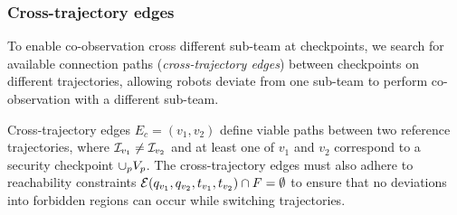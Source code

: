 \documentclass[10pt,twocolumn,twoside]{IEEEtran}
\newcommand{\news}{\color{blue}}
\begin{document}


\subsubsection{Cross-trajectory edges}\label{sec:cross-traj-edges}
To enable co-observation cross different sub-team at checkpoints, we search for available connection paths (\emph{cross-trajectory edges}) between checkpoints on different trajectories, allowing robots deviate from one sub-team to perform co-observation with a different sub-team. 

Cross-trajectory edges $E_c = (v_1, v_2)$ define viable paths between two reference trajectories, where $\mathcal{I}_{v_1}\neq\mathcal{I}_{v_2}$ and at least one of $v_1 $ and $v_2$ correspond to a security checkpoint $\cup_p V_p$. The cross-trajectory edges must also adhere to reachability constraints $\mathcal{E}(q_{v_1}, q_{v_2}, t_{v_1},t_{v_2}) \cap F = \emptyset$ to ensure that no deviations into forbidden regions can occur {\news while switching trajectories}.  
\end{document}
